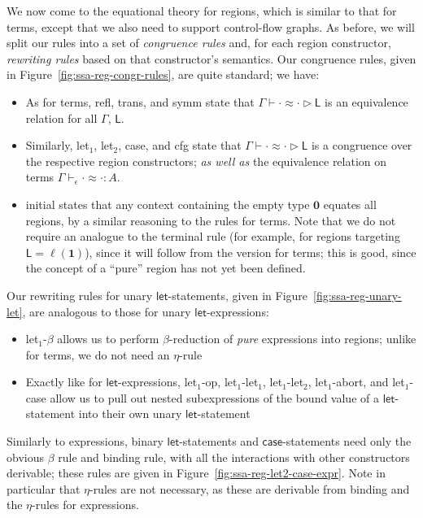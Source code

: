 \documentclass[acmsmall,screen,review]{acmart}
\newcommand{\mb}[1]{\ensuremath{\mathbf{#1}}}
\newcommand{\ms}[1]{\ensuremath{\mathsf{#1}}}
\newcommand{\lhyp}[2]{#1(#2)}
\newcommand{\teqv}{\approx}
\newcommand{\tmeq}[5]{#1 \vdash_{#2} #3 \teqv #4 : {#5}}
\newcommand{\lbeq}[4]{#1 \vdash #2 \teqv #3 \rhd {#4}}
\newcommand{\brle}[1]{{\textsf{#1}}}
\begin{document}
We now come to the equational theory for regions, which is similar to that for terms, except that we
also need to support control-flow graphs. As before, we will split our rules into a set of
\emph{congruence rules} and, for each region constructor, \emph{rewriting rules} based on that
constructor's semantics. Our congruence rules, given in Figure~\ref{fig:ssa-reg-congr-rules}, are
quite standard; we have:
\begin{itemize}
  \item As for terms, \brle{refl}, \brle{trans}, and \brle{symm} state that
  $\lbeq{\Gamma}{\cdot}{\cdot}{\ms{L}}$ is an equivalence relation for all $\Gamma$, $\ms{L}$.
  \item Similarly, \brle{let$_1$}, \brle{let$_2$}, \brle{case}, and \brle{cfg} state that
  $\lbeq{\Gamma}{\cdot}{\cdot}{\ms{L}}$ is a congruence over the respective region constructors;
  \emph{as well as} the equivalence relation on terms $\tmeq{\Gamma}{\epsilon}{\cdot}{\cdot}{A}$.
  \item \brle{initial} states that any context containing the empty type $\mb{0}$ equates all
  regions, by a similar reasoning to the rules for terms. Note that we do not require an analogue to
  the \brle{terminal} rule (for example, for regions targeting $\ms{L} = \lhyp{\ell}{\mb{1}}$),
  since it will follow from the version for terms; this is good, since the concept of a ``pure''
  region has not yet been defined.
\end{itemize}
Our rewriting rules for unary \ms{let}-statements, given in Figure~\ref{fig:ssa-reg-unary-let}, are
analogous to those for unary \ms{let}-expressions:
\begin{itemize}
  \item \brle{let$_1$-$\beta$} allows us to perform $\beta$-reduction of \emph{pure} expressions
  into regions; unlike for terms, we do not need an $\eta$-rule
  \item Exactly like for \ms{let}-expressions, \brle{let$_1$-op}, \brle{let$_1$-let$_1$},
  \brle{let$_1$-let$_2$}, \brle{let$_1$-abort}, and \brle{let$_1$-case} allow us to pull out nested
  subexpressions of the bound value of a \ms{let}-statement into their own unary \ms{let}-statement
\end{itemize}
Similarly to expressions, binary \ms{let}-statements and \ms{case}-statements need only the obvious
$\beta$ rule and binding rule, with all the interactions with other constructors derivable; these
rules are given in Figure~\ref{fig:ssa-reg-let2-case-expr}. Note in particular that $\eta$-rules are
not necessary, as these are derivable from binding and the $\eta$-rules for expressions.
\end{document}
